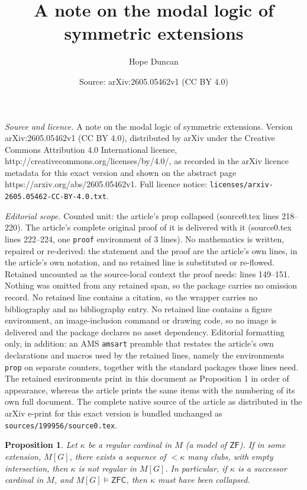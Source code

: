 \documentclass[10pt,a4paper]{amsart}
\title{A note on the modal logic of symmetric extensions}
\author{Hope Duncan}
\date{Source: arXiv:2605.05462v1 (CC BY 4.0)}
\newtheorem{prop}{Proposition}
\newcommand{\ZF}{\mathsf{ZF}}
\newcommand{\ZFC}{\mathsf{ZFC}}
\begin{document}
\maketitle

\noindent\emph{Source and licence.} A note on the modal logic of symmetric extensions. Version arXiv:2605.05462v1 (CC BY 4.0), distributed by arXiv under the Creative Commons Attribution 4.0 International licence, http://creativecommons.org/licenses/by/4.0/, as recorded in the arXiv licence metadata for this exact version and shown on the abstract page https://arxiv.org/abs/2605.05462v1. Full licence notice: \texttt{licenses/arxiv-2605.05462-CC-BY-4.0.txt}.\par\smallskip

\noindent\textit{Editorial scope.} Counted unit: the article's prop collapsed (source0.tex lines 218--220). The article's complete original proof of it is delivered with it (source0.tex lines 222--224, one \texttt{proof} environment of 3 lines). No mathematics is written, repaired or re-derived: the statement and the proof are the article's own lines, in the article's own notation, and no retained line is substituted or re-flowed.  Retained uncounted as the source-local context the proof needs: lines 149--151.  Nothing was omitted from any retained span, so the package carries no omission record.  No retained line contains a citation, so the wrapper carries no bibliography and no bibliography entry.  No retained line contains a figure environment, an image-inclusion command or drawing code, so no image is delivered and the package declares no asset dependency.  Editorial formatting only, in addition: an AMS \texttt{amsart} preamble that restates the article's own declarations and macros used by the retained lines, namely the environments \texttt{prop} on separate counters, together with the standard packages those lines need.  The retained environments print in this document as Proposition 1 in order of appearance, whereas the article prints the same items with the numbering of its own full document.  The complete native source of the article as distributed in the arXiv e-print for this exact version is bundled unchanged as \texttt{sources/199956/source0.tex}.
\begin{prop}\label{collapse}
    Let $\kappa$ be a regular cardinal in $M$ (a model of $\ZF$). If in some extension, $M[G]$, there exists a sequence of $<\kappa$ many clubs, with empty intersection, then $\kappa$ is not regular in $M[G]$. In particular, if $\kappa$ is a successor cardinal in $M$, and $M[G] \models \ZFC$, then $\kappa$ must have been collapsed. 
\end{prop}
\end{document}

